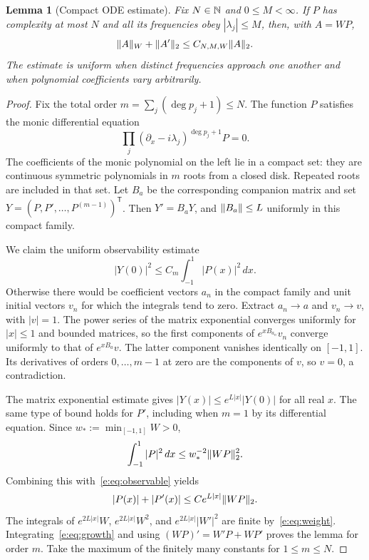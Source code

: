 \documentclass[11pt,a4paper]{article}
\numberwithin{equation}{section}
\newtheorem{lemma}[theorem]{Lemma}
\theoremstyle{definition}\newtheorem{definition}[theorem]{Definition}
\theoremstyle{remark}\newtheorem{remark}[theorem]{Remark}
\begin{document}
\begin{lemma}[Compact ODE estimate]\label{e:lem:ode}
Fix $N\in\mathbb N$ and $0\le M<\infty$. If $P$ has complexity at most $N$ and all
its frequencies obey $|\lambda_j|\le M$, then, with $A=WP$,
\begin{equation}\label{e:eq:envelope}
 \lVert A\rVert_W+\lVert A'\rVert_2\le C_{N,M,W}\lVert A\rVert_2.
\end{equation}
The estimate is uniform when distinct frequencies approach one another
and when polynomial coefficients vary arbitrarily.
\end{lemma}
\begin{proof}
Fix the total order $m=\sum_j(\deg p_j+1)\le N$. The function $P$
satisfies the monic differential equation
\begin{equation}\label{e:eq:annihilator}
 \prod_j(\partial_x-i\lambda_j)^{\deg p_j+1}P=0.
\end{equation}
The coefficients of the monic polynomial on the left lie in a compact set:
they are continuous symmetric polynomials in $m$ roots from a closed disk.
Repeated roots are included in that set. Let $B_a$ be the corresponding
companion matrix and set $Y=(P,P',\ldots,P^{(m-1)})^{\mathsf T}$. Then
$Y'=B_aY$, and $\lVert B_a\rVert\le L$ uniformly in this compact family.

We claim the uniform observability estimate
\begin{equation}\label{e:eq:observable}
 |Y(0)|^2\le C_m\int_{-1}^1|P(x)|^2\,dx.
\end{equation}
Otherwise there would be coefficient vectors $a_n$ in the compact family
and unit initial vectors $v_n$ for which the integrals tend to zero.
Extract $a_n\to a$ and $v_n\to v$, with $|v|=1$. The power series of the
matrix exponential converges uniformly for $|x|\le1$ and bounded matrices,
so the first components of $e^{xB_{a_n}}v_n$ converge uniformly to that of
$e^{xB_a}v$. The latter component vanishes identically on $[-1,1]$.
Its derivatives of orders $0,\ldots,m-1$ at zero are the components of $v$,
so $v=0$, a contradiction.

The matrix exponential estimate gives
$|Y(x)|\le e^{L|x|}|Y(0)|$ for all real $x$. The same type of bound holds
for $P'$, including when $m=1$ by its differential equation. Since
$w_*:=\min_{[-1,1]}W>0$,
\[
 \int_{-1}^1|P|^2\,dx\le w_*^{-2}\lVert WP\rVert_2^2.
\]
Combining this with~\eqref{e:eq:observable} yields
\begin{equation}\label{e:eq:growth}
 |P(x)|+|P'(x)|\le C e^{L|x|}\lVert WP\rVert_2.
\end{equation}
The integrals of $e^{2L|x|}W$, $e^{2L|x|}W^2$, and
$e^{2L|x|}|W'|^2$ are finite by~\eqref{e:eq:weight}.
Integrating~\eqref{e:eq:growth} and using $(WP)'=W'P+WP'$ proves the lemma
for order $m$. Take the maximum of the finitely many constants for
$1\le m\le N$.
\end{proof}
\end{document}

